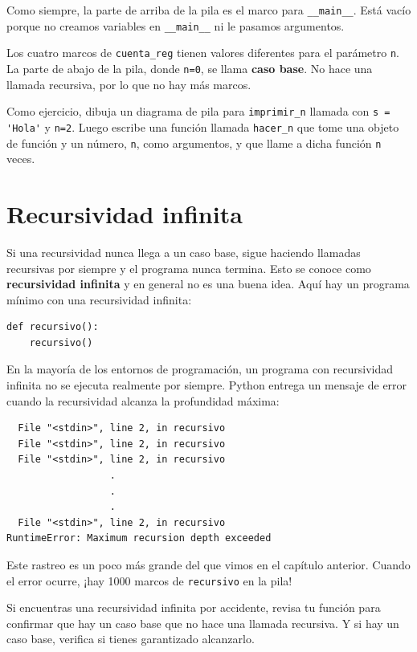 \documentclass[10pt]{book}
\begin{document}
Como siempre, la parte de arriba de la pila es el marco para \verb"__main__".
Está vacío porque no creamos variables en
\verb"__main__" ni le pasamos argumentos.

Los cuatro marcos de {\tt cuenta\_reg} tienen valores diferentes para el
parámetro {\tt n}.  La parte de abajo de la pila, donde {\tt n=0}, se
llama {\bf caso base}.  No hace una llamada recursiva, por lo que
no hay más marcos.

Como ejercicio, dibuja un diagrama de pila para \verb"imprimir_n" llamada con
\verb"s = 'Hola'" y {\tt n=2}.
Luego escribe una función llamada \verb"hacer_n" que tome una objeto de
función y un número, {\tt n}, como argumentos, y que llame
a dicha función {\tt n} veces.


\section{Recursividad infinita}

Si una recursividad nunca llega a un caso base, sigue haciendo
llamadas recursivas por siempre y el programa nunca termina.  Esto se
conoce como {\bf recursividad infinita} y en general no es
una buena idea.  Aquí hay un programa mínimo con una recursividad infinita:

\begin{verbatim}
def recursivo():
    recursivo()
\end{verbatim}
%
En la mayoría de los entornos de programación, un programa con recursividad infinita
no se ejecuta realmente por siempre.  Python entrega un
mensaje de error cuando la recursividad alcanza la profundidad máxima:

\begin{verbatim}
  File "<stdin>", line 2, in recursivo
  File "<stdin>", line 2, in recursivo
  File "<stdin>", line 2, in recursivo
                  .
                  .
                  .
  File "<stdin>", line 2, in recursivo
RuntimeError: Maximum recursion depth exceeded
\end{verbatim}
%
Este rastreo es un poco más grande del que vimos en el
capítulo anterior.  Cuando el error ocurre, ¡hay 1000
marcos de {\tt recursivo} en la pila!

Si encuentras una recursividad infinita por accidente, revisa
tu función para confirmar que hay un caso base que no
hace una llamada recursiva.  Y si hay un caso base, verifica si
tienes garantizado alcanzarlo.
\end{document}
